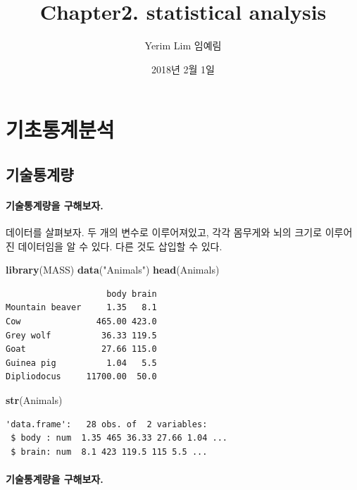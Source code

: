 \documentclass[]{article}
\title{Chapter2. statistical analysis}
\author{Yerim Lim 임예림}
\date{2018년 2월 1일}
\newenvironment{Shaded}{\begin{snugshade}}{\end{snugshade}}
\newcommand{\KeywordTok}[1]{\textcolor[rgb]{0.13,0.29,0.53}{\textbf{#1}}}
\newcommand{\StringTok}[1]{\textcolor[rgb]{0.31,0.60,0.02}{#1}}
\newcommand{\NormalTok}[1]{#1}
\let\oldparagraph\paragraph
\renewcommand{\paragraph}[1]{\oldparagraph{#1}\mbox{}}
\begin{document}
\maketitle

{
\setcounter{tocdepth}{2}
\tableofcontents
}
\section{기초통계분석}

\subsection{기술통계량}

\paragraph{기술통계량을 구해보자.}\label{-.}

데이터를 살펴보자. 두 개의 변수로 이루어져있고, 각각 몸무게와 뇌의
크기로 이루어진 데이터임을 알 수 있다. 
다른 것도 삽입할 수 있다. 

\begin{Shaded}
\begin{Highlighting}[]
\KeywordTok{library}\NormalTok{(MASS)}
\KeywordTok{data}\NormalTok{(}\StringTok{"Animals"}\NormalTok{)}
\KeywordTok{head}\NormalTok{(Animals)}
\end{Highlighting}
\end{Shaded}

\begin{verbatim}
                    body brain
Mountain beaver     1.35   8.1
Cow               465.00 423.0
Grey wolf          36.33 119.5
Goat               27.66 115.0
Guinea pig          1.04   5.5
Dipliodocus     11700.00  50.0
\end{verbatim}

\begin{Shaded}
\begin{Highlighting}[]
\KeywordTok{str}\NormalTok{(Animals)}
\end{Highlighting}
\end{Shaded}

\begin{verbatim}
'data.frame':   28 obs. of  2 variables:
 $ body : num  1.35 465 36.33 27.66 1.04 ...
 $ brain: num  8.1 423 119.5 115 5.5 ...
\end{verbatim}

\paragraph{\texorpdfstring{기술통계량을 구해보자.
}{기술통계량을 구해보자.  }}\label{-.-1}
\end{document}
